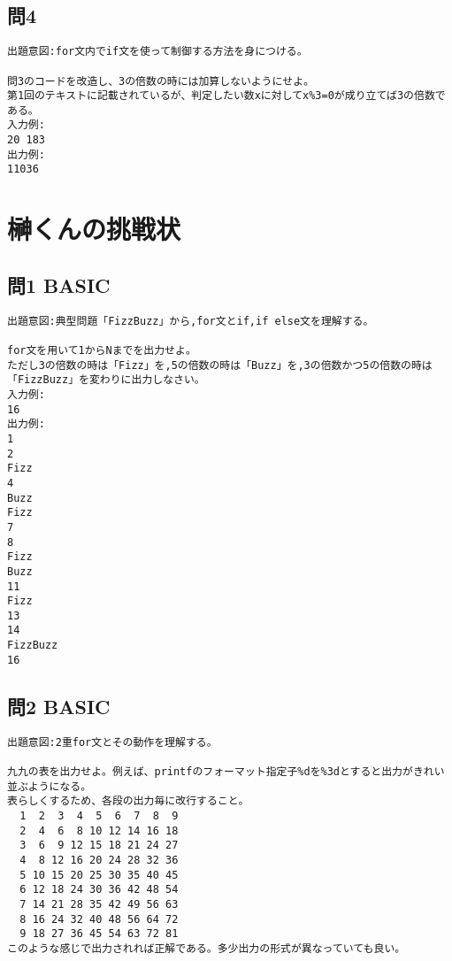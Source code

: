 \documentclass[a4j,titlepage,dvipdfmx]{jsarticle}   %
\begin{document}
\subsection{問4}
\begin{verbatim}
出題意図:for文内でif文を使って制御する方法を身につける。

問3のコードを改造し、3の倍数の時には加算しないようにせよ。
第1回のテキストに記載されているが、判定したい数xに対してx%3=0が成り立てば3の倍数である。
入力例:
20 183
出力例:
11036
\end{verbatim}

\section{榊くんの挑戦状}

\subsection{問1 BASIC}
\begin{verbatim}
出題意図:典型問題「FizzBuzz」から,for文とif,if else文を理解する。

for文を用いて1からNまでを出力せよ。
ただし3の倍数の時は「Fizz」を,5の倍数の時は「Buzz」を,3の倍数かつ5の倍数の時は「FizzBuzz」を変わりに出力しなさい。
入力例:
16
出力例:
1
2
Fizz
4
Buzz
Fizz
7
8
Fizz
Buzz
11
Fizz
13
14
FizzBuzz
16
\end{verbatim}

\subsection{問2 BASIC}
\begin{verbatim}
出題意図:2重for文とその動作を理解する。

九九の表を出力せよ。例えば、printfのフォーマット指定子%dを%3dとすると出力がきれい並ぶようになる。
表らしくするため、各段の出力毎に改行すること。
  1  2  3  4  5  6  7  8  9
  2  4  6  8 10 12 14 16 18
  3  6  9 12 15 18 21 24 27
  4  8 12 16 20 24 28 32 36
  5 10 15 20 25 30 35 40 45
  6 12 18 24 30 36 42 48 54
  7 14 21 28 35 42 49 56 63
  8 16 24 32 40 48 56 64 72
  9 18 27 36 45 54 63 72 81
このような感じで出力されれば正解である。多少出力の形式が異なっていても良い。
\end{verbatim}
\end{document}

